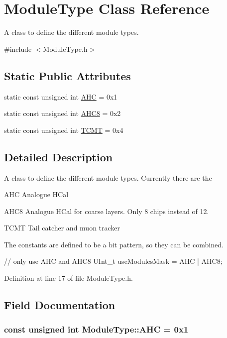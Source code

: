\hypertarget{class_module_type}{
\section{ModuleType Class Reference}
\label{class_module_type}
}


A class to define the different module types.  


{\ttfamily \#include $<$ModuleType.h$>$}\subsection*{Static Public Attributes}
\begin{DoxyCompactItemize}
\item 
static const unsigned int \hyperlink{class_module_type_aab41c936717bfb248a8bf1f38138db0b}{AHC} = 0x1
\item 
static const unsigned int \hyperlink{class_module_type_a9cbd6a48fabe66ed9d47d23e53d8c9b9}{AHC8} = 0x2
\item 
static const unsigned int \hyperlink{class_module_type_a64c7a7092ce31ace2f6e1a44918cd7cc}{TCMT} = 0x4
\end{DoxyCompactItemize}


\subsection{Detailed Description}
A class to define the different module types. Currently there are the \begin{DoxyItemize}
\item AHC Analogue HCal \item AHC8 Analogue HCal for coarse layers. Only 8 chips instead of 12. \item TCMT Tail catcher and muon tracker\end{DoxyItemize}
The constants are defined to be a bit pattern, so they can be combined. 
\begin{DoxyCode}
  // only use AHC and AHC8
  UInt_t useModulesMask = AHC | AHC8;
\end{DoxyCode}
 

Definition at line 17 of file ModuleType.h.

\subsection{Field Documentation}
\hypertarget{class_module_type_aab41c936717bfb248a8bf1f38138db0b}{
\subsubsection[{AHC}]{\setlength{\rightskip}{0pt plus 5cm}const unsigned int {\bf ModuleType::AHC} = 0x1}}
\label{class_module_type_aab41c936717bfb248a8bf1f38138db0b}


